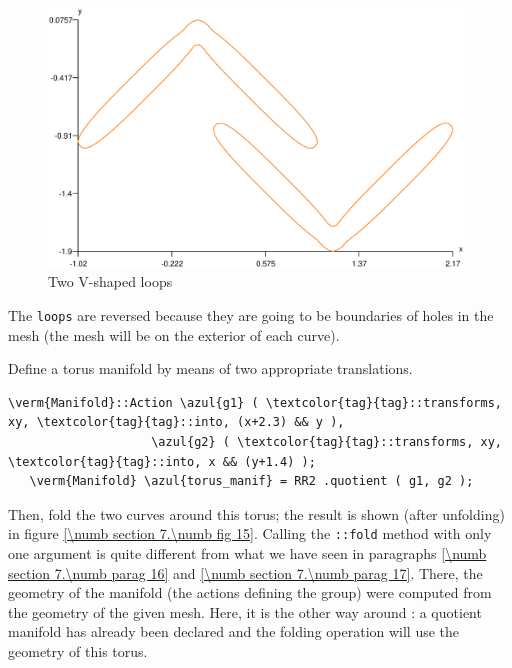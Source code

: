 \begin{figure}[ht] \centering
  \includegraphics[width=110mm]{boomerang-1.eps}
  \caption{Two V-shaped loops}
  \label{\numb section 7.\numb fig 14}
\end{figure}

The {\small\tt loops} are reversed because they are going to be boundaries of holes
in the mesh (the mesh will be on the exterior of each curve).

Define a torus manifold by means of two appropriate translations.

\begin{Verbatim}[commandchars=\\\{\},formatcom=\small\tt,frame=single,
   rulecolor=\color{coment},baselinestretch=0.94,framesep=2mm         ]
   \verm{Manifold}::Action \azul{g1} ( \textcolor{tag}{tag}::transforms, xy, \textcolor{tag}{tag}::into, (x+2.3) && y ),
                    \azul{g2} ( \textcolor{tag}{tag}::transforms, xy, \textcolor{tag}{tag}::into, x && (y+1.4) );
   \verm{Manifold} \azul{torus_manif} = RR2 .quotient ( g1, g2 );
\end{Verbatim}

\vskip -2mm
Then, fold the two curves around this torus; the result is shown (after unfolding) in figure
\ref{\numb section 7.\numb fig 15}.
Calling the {\small\tt{}::fold} method with only one argument is quite different
from what we have seen in paragraphs \ref{\numb section 7.\numb parag 16} and
\ref{\numb section 7.\numb parag 17}.
There, the geometry of the manifold (the actions defining the group) were computed from
the geometry of the given mesh.
Here, it is the other way around : a quotient manifold has already been declared and
the folding operation will use the geometry of this torus.

